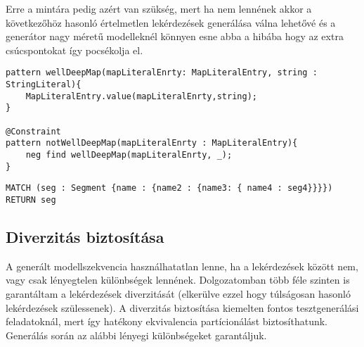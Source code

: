 Erre a mintára pedig azért van szükség, mert ha nem lennének akkor a következőhöz hasonló értelmetlen lekérdezések generálása válna lehetővé és a generátor nagy méretű modelleknél könnyen esne abba a hibába hogy az extra csúcspontokat így pocsékolja el.


\begin{lstlisting}[style=viatrasmall]
pattern wellDeepMap(mapLiteralEnrty: MapLiteralEntry, string : StringLiteral){
	MapLiteralEntry.value(mapLiteralEnrty,string);
}

@Constraint
pattern notWellDeepMap(mapLiteralEnrty : MapLiteralEntry){
	neg find wellDeepMap(mapLiteralEnrty, _);
}
\end{lstlisting}



\begin{lstlisting}[style=cyphersmall]
MATCH (seg : Segment {name : {name2 : {name3: { name4 : seg4}}}}) 
RETURN seg
\end{lstlisting}



\subsection{Diverzitás biztosítása}
A generált modellszekvencia használhatatlan lenne, ha a lekérdezések között nem, vagy csak lényegtelen különbségek lennének. Dolgozatomban több féle szinten is garantáltam a lekérdezések diverzitását (elkerülve ezzel hogy túlságosan hasonló lekérdezések szülessenek). A diverzitás biztosítása kiemelten fontos tesztgenerálási feladatoknál, mert így hatékony ekvivalencia partícionálást biztosíthatunk. Generálás során az alábbi lényegi különbségeket garantáljuk.

